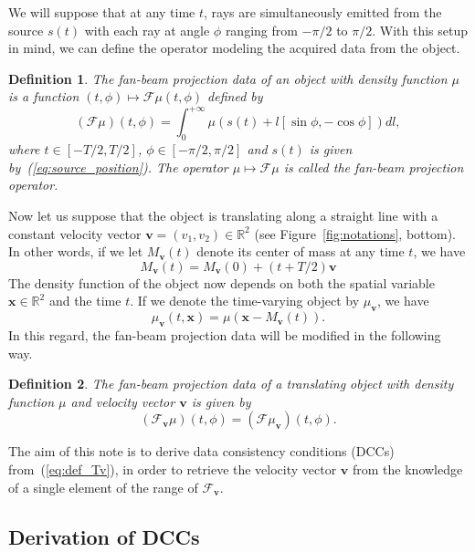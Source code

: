 \documentclass[twocolumn]{IEEEtran}
\newcommand{\R}{\mathbb{R}}
\newcommand{\bx}{\mathbf{x}}
\newcommand{\bv}{\mathbf{v}}
\newcommand{\Mbv}{M_{\mathbf{v}}}
\newcommand{\Tbv}{\mathcal{F}_{\mathbf{v}}}
\newcommand{\mubv}{\mu_{\mathbf{v}}}
\newtheorem{definition}{Definition}
\begin{document}
We will suppose that at any time $t$, rays are simultaneously emitted from the source $s(t)$ with each ray at angle $\phi$ ranging from $-\pi/2$ to $\pi/2$. With this setup in mind, we can define the operator modeling the acquired data from the object.
\begin{definition}
The \emph{fan-beam projection data} of an object with density function $\mu$ is a function $(t,\phi) \mapsto \mathcal{F}\mu(t,\phi)$ defined by
\begin{equation}
	(\mathcal{F}\mu)(t,\phi) = \int_0^{+\infty} \mu \left( s(t) + l \left[ \sin \phi, -\cos \phi \right] \right) dl,
\end{equation}
where $t \in \left[ -T/2, T/2\right]$, $\phi \in \left[ -\pi/2, \pi/2\right]$ and $s(t)$ is given by~(\ref{eq:source_position}). The operator $\mu \mapsto \mathcal{F}\mu$ is called the \emph{fan-beam projection operator}.
\end{definition}


Now let us suppose that the object is translating along a straight line with a constant velocity vector $\bv = (v_1, v_2)\in \R^2$ (see Figure~\ref{fig:notations}, bottom). In other words, if we let $\Mbv(t)$ denote its center of mass at any time $t$, we have
\begin{equation}
	\Mbv(t) =   \Mbv(0) + \left( t + T/2 \right) \bv
\label{eq:center_of_mass}
\end{equation}
The density function of the object now depends on both the spatial variable $\bx \in \R^2$ and the time $t$. If we denote the time-varying object by $\mubv$, we have
\begin{equation}
	\mubv(t,\bx) = \mu\left( \bx - \Mbv(t)\right).
\end{equation}
In this regard, the fan-beam projection data will be modified in the following way.
\begin{definition}
The \emph{fan-beam projection data of a translating object} with density function $\mu$ and  velocity vector $\bv$ is given by
\begin{equation}
	(\Tbv\mu)(t,\phi) =  ( \mathcal{F} \mubv ) (t,\phi).
\label{eq:def_Tv}
\end{equation}
\end{definition}

The aim of this note is to derive data consistency conditions (DCCs) from~(\ref{eq:def_Tv}), in order to retrieve the velocity vector $\bv$ from the knowledge of a single element of the range of $\Tbv$.

\subsection{Derivation of DCCs}
\end{document}
